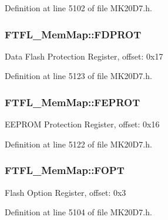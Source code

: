 Definition at line 5102 of file M\+K20\+D7.\+h.

\subsubsection[{\texorpdfstring{F\+D\+P\+R\+OT}{FDPROT}}]{ F\+T\+F\+L\+\_\+\+Mem\+Map\+::\+F\+D\+P\+R\+OT}\hypertarget{struct_f_t_f_l___mem_map_a9895b93e7b82c0d97d2d68599ecf5127}{}\label{struct_f_t_f_l___mem_map_a9895b93e7b82c0d97d2d68599ecf5127}
Data Flash Protection Register, offset\+: 0x17 

Definition at line 5123 of file M\+K20\+D7.\+h.

\subsubsection[{\texorpdfstring{F\+E\+P\+R\+OT}{FEPROT}}]{ F\+T\+F\+L\+\_\+\+Mem\+Map\+::\+F\+E\+P\+R\+OT}\hypertarget{struct_f_t_f_l___mem_map_a6adbdbfefbfc030599d96a16cdba45b9}{}\label{struct_f_t_f_l___mem_map_a6adbdbfefbfc030599d96a16cdba45b9}
E\+E\+P\+R\+OM Protection Register, offset\+: 0x16 

Definition at line 5122 of file M\+K20\+D7.\+h.

\subsubsection[{\texorpdfstring{F\+O\+PT}{FOPT}}]{ F\+T\+F\+L\+\_\+\+Mem\+Map\+::\+F\+O\+PT}\hypertarget{struct_f_t_f_l___mem_map_a2d17b69bebe89f8d8c18f983a8c68d84}{}\label{struct_f_t_f_l___mem_map_a2d17b69bebe89f8d8c18f983a8c68d84}
Flash Option Register, offset\+: 0x3 

Definition at line 5104 of file M\+K20\+D7.\+h.

